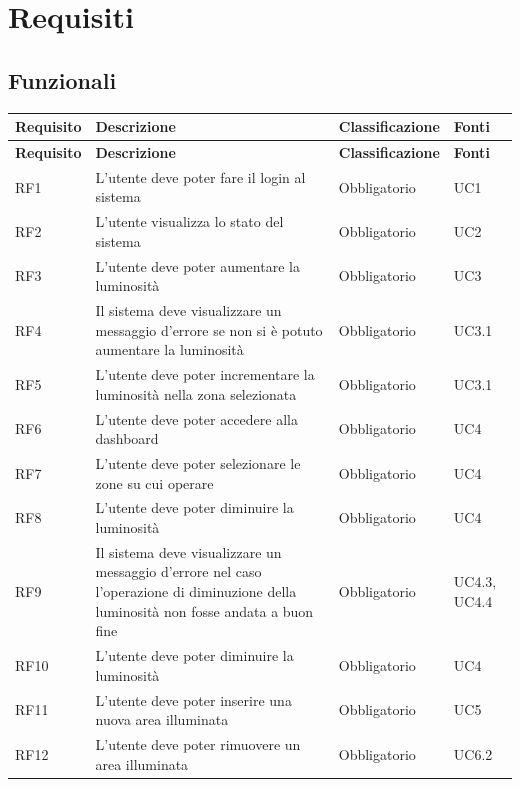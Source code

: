 \documentclass[12pt]{article}
\begin{document}
\section{Requisiti}
\subsection{Funzionali}

\begin{xltabular}{\linewidth}{|>{\hsize}X|>{\hsize}X|>{\hsize}X|>{\hsize}X|}
\hline
\textbf{Requisito} & \textbf{Descrizione} & \textbf{Classificazione} & \textbf{Fonti} \\
\hline
\endfirsthead
\hline
\textbf{Requisito} & \textbf{Descrizione} & \textbf{Classificazione} & \textbf{Fonti} \\
\hline
\endhead
\hline
\endfoot
RF1	 & L'utente deve poter fare il login al sistema	 & Obbligatorio	 & UC1 \\
\hline				
RF2	 & L'utente visualizza lo stato del sistema	 & Obbligatorio	 & UC2 \\
\hline				
RF3	 & L'utente deve poter aumentare la luminosità	 & Obbligatorio	 & UC3 \\
\hline				
RF4	 & Il sistema deve visualizzare un messaggio d'errore se non si è potuto aumentare la luminosità	 & Obbligatorio	 & UC3.1 \\
\hline				
RF5	 & L'utente deve poter incrementare la luminosità nella zona selezionata	 & Obbligatorio	 & UC3.1 \\
\hline				
RF6	 & L'utente deve poter accedere alla dashboard	 & Obbligatorio	 & UC4 \\
\hline				
RF7	 & L'utente deve poter selezionare le zone su cui operare	 & Obbligatorio	 & UC4 \\
\hline				
RF8	 & L'utente deve poter diminuire la luminosità	 & Obbligatorio	 & UC4 \\
\hline				
RF9	 & Il sistema deve visualizzare un messaggio d'errore nel caso l'operazione di diminuzione della luminosità non fosse andata a buon fine	 & Obbligatorio	 & UC4.3, UC4.4 \\
\hline				
RF10	 & L'utente deve poter diminuire la luminosità	 & Obbligatorio	 & UC4 \\
\hline				
RF11	 & L'utente deve poter inserire una nuova area illuminata	 & Obbligatorio	 & UC5 \\
\hline				
RF12	 & L'utente deve poter rimuovere un area illuminata	 & Obbligatorio	 & UC6.2 \\

\end{xltabular}
\end{document}
